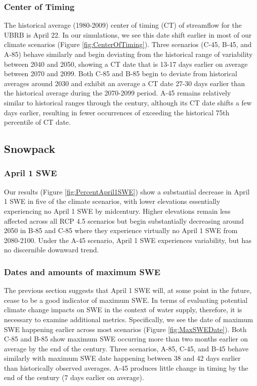 \documentclass[11pt,letterpaper]{article}
\begin{document}
\subsubsection{Center of Timing}

The historical average (1980-2009) center of timing (CT) of streamflow for the UBRB is April 22. In our simulations, we see this date shift earlier in most of our climate scenarios (Figure \ref{fig:CenterOfTiming}). Three scenarios (C-45, B-45, and A-85) behave similarly and begin deviating from the historical range of variability between 2040 and 2050, showing a CT date that is 13-17 days earlier on average between 2070 and 2099. Both C-85 and B-85 begin to deviate from historical averages around 2030 and exhibit an average a CT date 27-30 days earlier than the historical average during the 2070-2099 period. A-45 remains relatively similar to historical ranges through the century, although its CT date shifts a few days earlier, resulting in fewer occurrences of exceeding the historical 75th percentile of CT date. 

\subsection{Snowpack}

\subsubsection{April 1 SWE}

Our results (Figure \ref{fig:PercentApril1SWE}) show a substantial decrease in April 1 SWE in five of the climate scenarios, with lower elevations essentially experiencing no April 1 SWE by midcentury. Higher elevations remain less affected across all RCP 4.5 scenarios but begin substantially decreasing around 2050 in B-85 and C-85 where they experience virtually no April 1 SWE from 2080-2100. Under the A-45 scenario, April 1 SWE experiences variability, but has no discernible downward trend. 

\subsubsection{Dates and amounts of maximum SWE}

The previous section suggests that April 1 SWE will, at some point in the future, cease to be a good indicator of maximum SWE. In terms of evaluating potential climate change impacts on SWE in the context of water supply, therefore, it is necessary to examine additional metrics. Specifically, we see the date of maximum SWE happening earlier across most scenarios (Figure \ref{fig:MaxSWEDate}). Both C-85 and B-85 show maximum SWE occurring more than two months earlier on average by the end of the century. Three scenarios, A-85, C-45, and B-45 behave similarly with maximum SWE date happening between 38 and 42 days earlier than historically observed averages. A-45 produces little change in timing by the end of the century (7 days earlier on average). 
\end{document}
